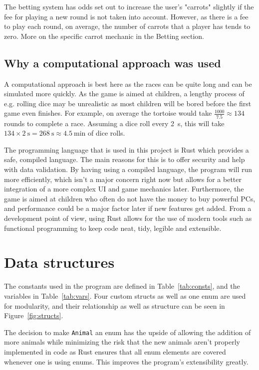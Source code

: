 \documentclass[11pt]{article}
\begin{document}
The betting system has odds set out to increase the user's "carrots" slightly if the fee for
playing a new round is not taken into account. However, as there is a fee to play each round,
on average, the number of carrots that a player has tends to zero. More on the specific carrot
mechanic in the Betting section.

\subsection{Why a computational approach was used}
\label{sec:approach}
A computational approach is best here as the races can be quite long and can be simulated more
quickly. As the game is aimed at children, a lengthy process of e.g. rolling dice may be unrealistic
as most children will be bored before the first game even finishes. For example, on average the
tortoise would take \(\frac{1000}{7.5} \approx 134\) rounds to complete a race. Assuming a dice roll
every \qty{2}{\second}, this will take
\(134 \times \qty{2}{\second} = \qty{268}{\second} \approx \qty{4.5}{\minute}\) of dice rolls.

The programming language that is used in this project is Rust \cite{rust} which provides a
safe, compiled language. The main reasons for this is to offer security and help with data
validation. By having using a compiled language, the program will run more efficiently, which
isn't a major concern right now but allows for a better integration of a more complex UI and
game mechanics later. Furthermore, the game is aimed at children who often do not have the money to
buy powerful PCs, and performance could be a major factor later if new features get added.
From a development point of view, using Rust allows for the use of modern tools such as functional
programming to keep code neat, tidy, legible and extensible.

\section{Data structures}
The constants used in the program are defined in Table~\ref{tab:consts}, and the variables
in Table~\ref{tab:vars}. Four custom structs as well as one enum are used for modularity, and
their relationship as well as structure can be seen in Figure~\ref{fig:structs}.

The decision to make \texttt{Animal} an enum has the upside of allowing the addition of  more animals
while minimizing the risk that the new animals aren't properly implemented in code as Rust ensures that
all enum elements are covered whenever one is using enums. This improves the program's extensibility
greatly.
\end{document}
